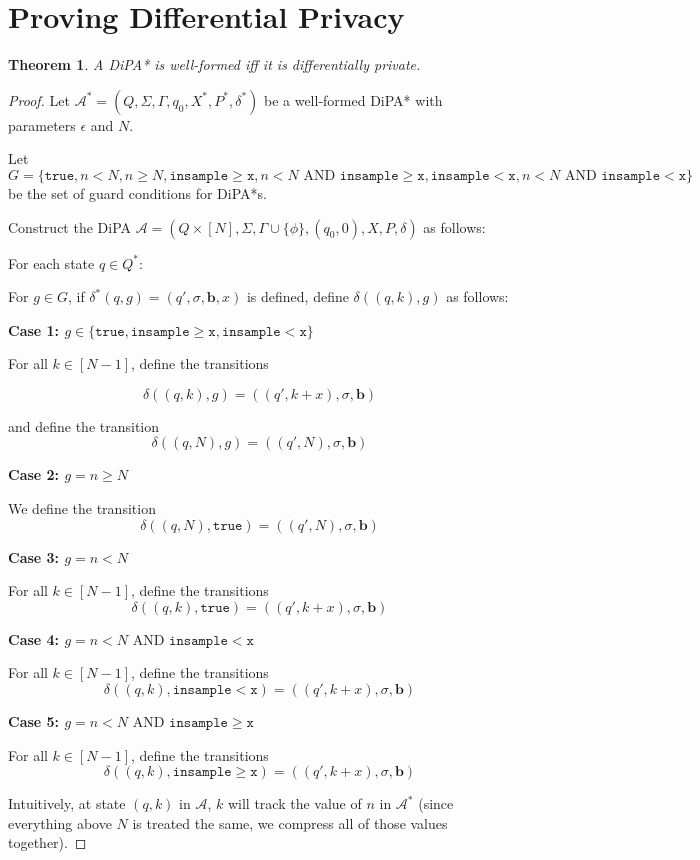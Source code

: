 \documentclass[12pt]{article}
\newcommand{\gguard}{\texttt{insample}\geq \texttt{x}}
\newcommand{\lguard}{\texttt{insample} < \texttt{x}}
\newcommand{\gaguard}{n<N \text{ AND } \texttt{insample} \geq \texttt{x}}
\newcommand{\laguard}{n<N\text{ AND }\texttt{insample} < \texttt{x}}
\newtheorem{thm}{Theorem}[section]
\theoremstyle{definition}
\begin{document}
\section{Proving Differential Privacy}

\begin{thm} 
	A DiPA* is well-formed iff it is differentially private.
\end{thm}

\begin{proof}

Let $\mathcal{A}^* = (Q, \Sigma, \Gamma, q_0, X^*, P^*, \delta^*)$ be a well-formed DiPA* with parameters $\epsilon$ and $N$. 

Let $G = \{\texttt{true}, n<N, n\geq N, \gguard, \gaguard, \lguard,\laguard \}$ be the set of guard conditions for DiPA*s.

Construct the DiPA $\mathcal{A} = (Q \times [N], \Sigma, \Gamma\cup \{\phi\}, (q_0, 0), X, P, \delta)$ as follows:

For each state $q \in Q^*$:

For $g\in G$, if $\delta^*(q, g) = (q', \sigma, \mathbf{b}, x)$ is defined, define $\delta((q, k), g)$ as follows:

\textbf{Case 1: $g \in \{\texttt{true}, \gguard, \lguard\}$}

For all $k \in [N-1]$, define the transitions

\[
	\delta((q, k), g) = ((q', k+x), \sigma, \mathbf{b})	
\]

and define the transition
\[
	\delta((q, N), g) = ((q', N), \sigma, \mathbf{b})	
\]

\textbf{Case 2: $g = n \geq N$}

We define the transition 
\[
	\delta((q, N), \texttt{true}) = ((q', N), \sigma, \mathbf{b})
\]

\textbf{Case 3: $g = n < N$}

For all $k \in [N-1]$, define the transitions
\[
	\delta((q, k), \texttt{true}) = ((q', k+x), \sigma, \mathbf{b})	
\]

\textbf{Case 4: $g = \laguard $}

For all $k \in [N-1]$, define the transitions
\[
	\delta((q, k), \lguard) = ((q', k+x), \sigma, \mathbf{b})	
\]

\textbf{Case 5: $g = \gaguard $}

For all $k \in [N-1]$, define the transitions
\[
	\delta((q, k), \gguard) = ((q', k+x), \sigma, \mathbf{b})	
\]

Intuitively, at state $(q, k)$ in $\mathcal{A}$, $k$ will track the value of $n$ in $\mathcal{A}^*$ (since everything above $N$ is treated the same, we compress all of those values together).


\end{proof}
\end{document}
